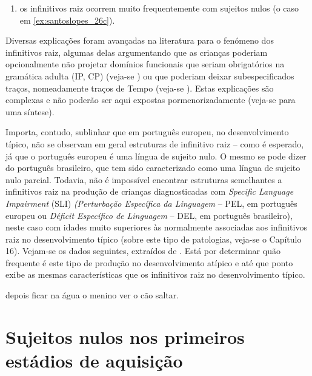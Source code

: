 \documentclass[output=paper]{LSP/langsci}
\begin{document}
\begin{enumerate}[label=(\roman*),resume]
\item os infinitivos raiz ocorrem muito frequentemente com sujeitos nulos (o caso em \ref{ex:santoslopes_26c}).
\end{enumerate}

Diversas explicações foram avançadas na literatura para o fenómeno dos infinitivos raiz, algumas delas argumentando que as crianças poderiam opcionalmente não projetar domínios funcionais que seriam obrigatórios na gramática adulta (IP, CP) (veja-se \citealt{rizzi1993}) ou que poderiam deixar subespecificados traços, nomeadamente traços de Tempo (veja-se \citealt{wexler1994}). Estas explicações são complexas e não poderão ser aqui expostas pormenorizadamente (veja-se \citealt[128 e ss.]{guasti2002} para uma síntese).

Importa, contudo, sublinhar que em português europeu, no desenvolvimento típico, não se observam em geral estruturas de infinitivo raiz – como é esperado, já que o português europeu é uma língua de sujeito nulo. O mesmo se pode dizer do português brasileiro, que tem sido caracterizado como uma língua de sujeito nulo parcial. Todavia, não é impossível encontrar estruturas semelhantes a infinitivos raiz na produção de crianças diagnosticadas com \textit{Specific Language Impairment} (SLI) \textit{(Perturbação Específica da Linguagem} – PEL, em português europeu ou \textit{Déficit Específico de Linguagem} – DEL, em português brasileiro), neste caso com idades muito superiores às normalmente associadas aos infinitivos raiz no desenvolvimento típico (sobre este tipo de patologias, veja-se o Capítulo 16). Vejam-se os dados seguintes, extraídos de \citet{kay1997}. Está por determinar quão frequente é este tipo de produção no desenvolvimento atípico e até que ponto exibe as mesmas características que os infinitivos raiz no desenvolvimento típico.

\ea\label{ex:santoslopes_27}
\ea\label{ex:santoslopes_27a}
depois ficar na água
\ex\label{ex:santoslopes_27b}
o menino ver o cão saltar.
\zl

\section{Sujeitos nulos nos primeiros estádios de aquisição}
\label{sec:santoslopes_sujeitos_nulos}
\end{document}
